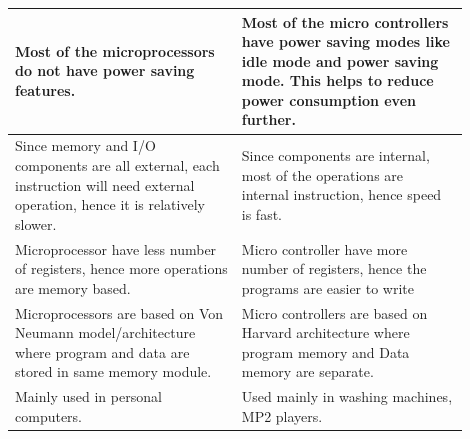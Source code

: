 \documentclass[a4paper]{article}
\begin{document}
\begin{enumerate}[label = \arabic*.]
\begin{table}[H]
\begin{tabular}{p{0.45\linewidth} p{0.45\linewidth}}
          \midrule
          Most of the microprocessors do not have power saving features.                                                                                          & Most of the micro controllers have power saving modes like idle mode and power saving mode. This helps to reduce power consumption even further. \\
          \midrule
          Since memory and I/O components are all external, each instruction will need external operation, hence it is relatively slower.                         & Since components are internal, most of the operations are internal instruction, hence speed is fast.                                             \\
          \midrule
          Microprocessor have less number of registers, hence more operations are memory based.                                                                   & Micro controller have more number of registers, hence the programs are easier to write                                                           \\
          \midrule
          Microprocessors are based on Von Neumann model/architecture where program and data are stored in same memory module.                                    & Micro controllers are based on Harvard architecture where program memory and Data memory are separate.                                           \\
          \midrule
          Mainly used in personal computers.                                                                                                                      & Used mainly in washing machines, MP2 players.                                                                                                    \\
          \bottomrule
        \end{tabular}
        \label{tab:MCU_MPU}
      \end{table}


\end{enumerate}
\end{document}
